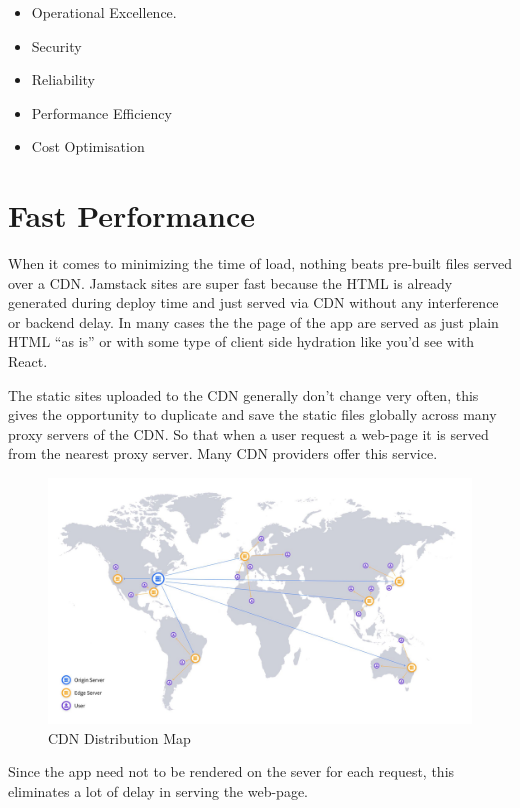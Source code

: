 \documentclass[12pt,a4paper,oneside]{report}
\begin{document}
\begin{itemize}
\item Operational Excellence.
\item Security
\item Reliability
\item Performance Efficiency
\item Cost Optimisation
\end{itemize}

\section{Fast Performance}
\par
When it comes to minimizing the time of load, nothing beats pre-built files served over a CDN. Jamstack sites are super fast because the HTML is already generated during deploy time and just served via CDN without any interference or backend delay. In many cases the the page of the app are served as just plain HTML ``as is'' or with some type of client side hydration like you’d see with React.

\par 
The static sites uploaded to the CDN generally don't change very often, this gives the opportunity to duplicate and save the static files globally across many proxy servers of the CDN. So that when a user request a web-page it is served from the nearest proxy server. Many CDN providers offer this service.

\begin{figure}[H]
    \centering
    \includegraphics[scale=.18]{images/cdn-distribution-map.jpg}
    \caption{CDN Distribution Map\cite{fcc2}}
\end{figure}

\par 
Since the app need not to be rendered on the sever for each request, this eliminates a lot of delay in serving the web-page.
\end{document}
